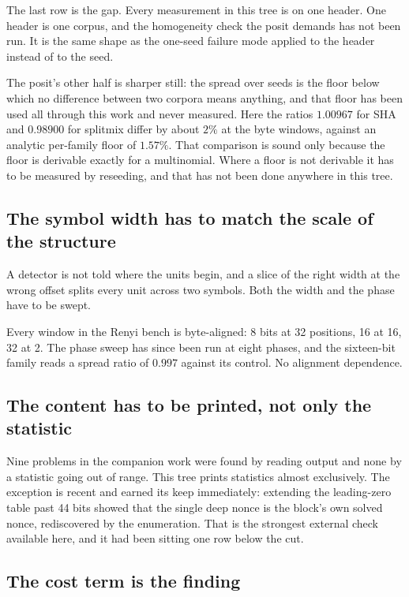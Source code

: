 The last row is the gap. Every measurement in this tree is on one header. One header is one corpus, and the homogeneity check the posit demands has not been run. It is the same shape as the one-seed failure mode applied to the header instead of to the seed.

The posit's other half is sharper still: the spread over seeds is the floor below which no difference between two corpora means anything, and that floor has been used all through this work and never measured. Here the ratios \(1.00967\) for SHA and \(0.98900\) for splitmix differ by about \(2\%\) at the byte windows, against an analytic per-family floor of \(1.57\%\). That comparison is sound only because the floor is derivable exactly for a multinomial. Where a floor is not derivable it has to be measured by reseeding, and that has not been done anywhere in this tree.

\subsection{The symbol width has to match the scale of the structure}

A detector is not told where the units begin, and a slice of the right width at the wrong offset splits every unit across two symbols. Both the width and the phase have to be swept.

Every window in the Renyi bench is byte-aligned: 8 bits at 32 positions, 16 at 16, 32 at 2. The phase sweep has since been run at eight phases, and the sixteen-bit family reads a spread ratio of \(0.997\) against its control. No alignment dependence.

\subsection{The content has to be printed, not only the statistic}

Nine problems in the companion work were found by reading output and none by a statistic going out of range. This tree prints statistics almost exclusively. The exception is recent and earned its keep immediately: extending the leading-zero table past 44 bits showed that the single deep nonce is the block's own solved nonce, rediscovered by the enumeration. That is the strongest external check available here, and it had been sitting one row below the cut.

\subsection{The cost term is the finding}

